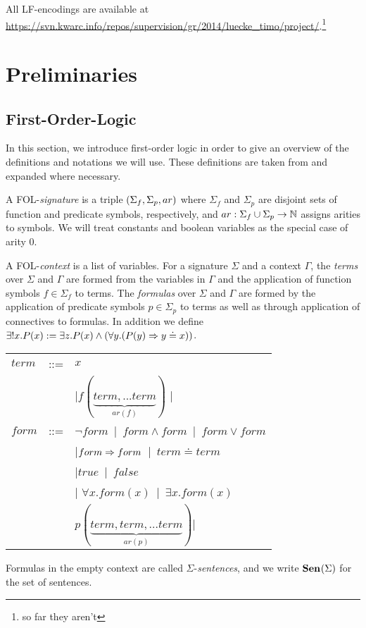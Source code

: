 \documentclass{article}
\begin{document}
All LF-encodings are available at \url{https://svn.kwarc.info/repos/supervision/gr/2014/luecke_timo/project/}.\footnote{so far they aren't}


\section{Preliminaries}

\subsection{First-Order-Logic}
In this section, we  introduce first-order logic in order to give an overview of the definitions and notations we will use. These definitions are taken from \cite{FOLsound}
and expanded where necessary.

\begin{definition}[Signatures]\label{def:folsig}
A FOL-\emph{signature} is a triple $(\Sigma_f,\Sigma_p,ar)$ where $\Sigma_f$ and $\Sigma_p$ are disjoint sets of function and predicate symbols, respectively, and $ar:\Sigma_f\cup\Sigma_p\rightarrow\mathbb{N}$ assigns arities to symbols. We will treat constants and boolean variables as the special case of arity $0$.
\end{definition}

\begin{definition}[Expressions]\label{def:folexpr}
A FOL-\emph{context} is a list of variables.
For a signature $\Sigma$ and a context $\Gamma$, the \emph{terms} over $\Sigma$ and $\Gamma$ are formed from the variables in $\Gamma$ and the application of function symbols $f\in\Sigma_f$ to terms.
The \emph{formulas} over $\Sigma$ and $\Gamma$ are formed by the application of predicate symbols $p\in\Sigma_p$ to terms as well as through application of connectives to formulas. In addition we define $\exists! x.P(x) := \exists z.P(x)\wedge (\forall y. (P(y)\Rightarrow y\doteq x))$.


\begin{tabular}{ p{1cm}p{1cm}p{8cm}}
$term$ & ::= & $x$ \\
		&	&  |$f(\underbrace{term, ... term}_{ar(f)})$  | \\
$form$ & ::= &  $\neg form$\ |\ $form\wedge form$\ |\ $form\vee form$\\
		&  & |$form\Rightarrow form$\ |\ $term\doteq term$ \\
       &  & |$true$\ |\ $false$ \\
        &   &| $\forall x.form(x)$\ |\ $\exists x.form(x)$\\ 
      
		&  & $p(\underbrace{term, term,... term}_{ar(p)}) |$\\ 

\end{tabular}

Formulas in the empty context are called $\Sigma$-\emph{sentences}, and we write ${\mathbf{Sen}^{}}(\Sigma)$ for the set of sentences.
\end{definition}
\end{document}
